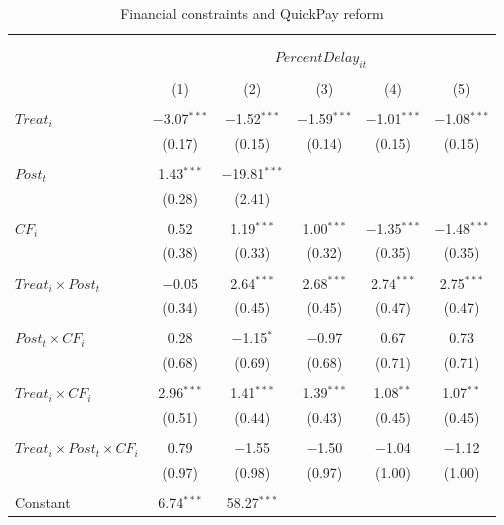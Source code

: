 \documentclass[
]{article}
\begin{document}
\begin{table}[H] \centering 
  \caption{Financial constraints and QuickPay reform} 
  \label{} 
\small 
\begin{tabular}{@{\extracolsep{-2pt}}lccccc} 
\\[-1.8ex]\hline 
\hline \\[-1.8ex] 
\\[-1.8ex] & \multicolumn{5}{c}{$PercentDelay_{it}$  } \\ 
\\[-1.8ex] & (1) & (2) & (3) & (4) & (5)\\ 
\hline \\[-1.8ex] 
 $Treat_i$ & $-$3.07$^{***}$ & $-$1.52$^{***}$ & $-$1.59$^{***}$ & $-$1.01$^{***}$ & $-$1.08$^{***}$ \\ 
  & (0.17) & (0.15) & (0.14) & (0.15) & (0.15) \\ 
  & & & & & \\ 
 $Post_t$ & 1.43$^{***}$ & $-$19.81$^{***}$ &  &  &  \\ 
  & (0.28) & (2.41) &  &  &  \\ 
  & & & & & \\ 
 $CF_i$ & 0.52 & 1.19$^{***}$ & 1.00$^{***}$ & $-$1.35$^{***}$ & $-$1.48$^{***}$ \\ 
  & (0.38) & (0.33) & (0.32) & (0.35) & (0.35) \\ 
  & & & & & \\ 
 $Treat_i \times Post_t$ & $-$0.05 & 2.64$^{***}$ & 2.68$^{***}$ & 2.74$^{***}$ & 2.75$^{***}$ \\ 
  & (0.34) & (0.45) & (0.45) & (0.47) & (0.47) \\ 
  & & & & & \\ 
 $Post_t \times CF_i$ & 0.28 & $-$1.15$^{*}$ & $-$0.97 & 0.67 & 0.73 \\ 
  & (0.68) & (0.69) & (0.68) & (0.71) & (0.71) \\ 
  & & & & & \\ 
 $Treat_i \times CF_i$ & 2.96$^{***}$ & 1.41$^{***}$ & 1.39$^{***}$ & 1.08$^{**}$ & 1.07$^{**}$ \\ 
  & (0.51) & (0.44) & (0.43) & (0.45) & (0.45) \\ 
  & & & & & \\ 
 $Treat_i \times Post_t \times CF_i$ & 0.79 & $-$1.55 & $-$1.50 & $-$1.04 & $-$1.12 \\ 
  & (0.97) & (0.98) & (0.97) & (1.00) & (1.00) \\ 
  & & & & & \\ 
 Constant & 6.74$^{***}$ & 58.27$^{***}$ &  &  &  \\ 

\end{tabular}
\end{table}
\end{document}
